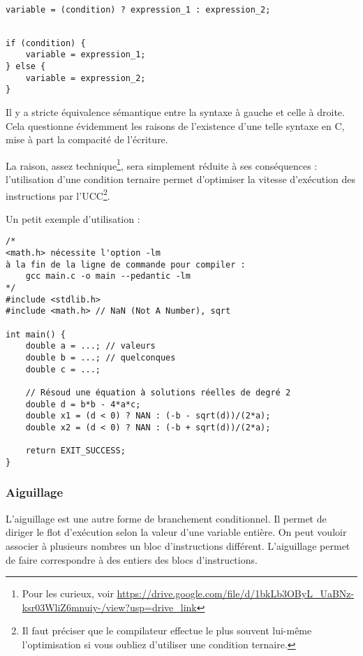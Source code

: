 \documentclass[../../../main.tex]{subfiles}
\begin{document}
\begin{minipage}{0.65\textwidth}
\begin{verbatim}


variable = (condition) ? expression_1 : expression_2;


\end{verbatim}
\end{minipage}
\begin{minipage}{0.35\textwidth}
\begin{verbatim}
if (condition) {
	variable = expression_1;
} else {
	variable = expression_2;
}
\end{verbatim}
\end{minipage}
 
Il y a stricte équivalence sémantique entre la syntaxe à gauche et celle à droite. Cela questionne évidemment les raisons de l'existence d'une telle syntaxe en C, mise à part la compacité de l'écriture.
 
La raison, assez technique\footnote{Pour les curieux, voir \url{https://drive.google.com/file/d/1bkLb3OByL_UaBNz-ksr03WliZ6mnuiy-/view?usp=drive_link}}, sera simplement réduite à ses conséquences : l'utilisation d'une condition ternaire permet d'optimiser la vitesse d'exécution des instructions par l'UCC\footnote{Il faut préciser que le compilateur effectue le plus souvent lui-même l'optimisation si vous oubliez d'utiliser une condition ternaire.}.
 
Un petit exemple d'utilisation :
\begin{verbatim}
/*
<math.h> nécessite l'option -lm
à la fin de la ligne de commande pour compiler :
	gcc main.c -o main --pedantic -lm
*/
#include <stdlib.h>
#include <math.h> // NaN (Not A Number), sqrt

int main() {
	double a = ...; // valeurs
	double b = ...; // quelconques
	double c = ...;

	// Résoud une équation à solutions réelles de degré 2
	double d = b*b - 4*a*c;
	double x1 = (d < 0) ? NAN : (-b - sqrt(d))/(2*a);
	double x2 = (d < 0) ? NAN : (-b + sqrt(d))/(2*a);

	return EXIT_SUCCESS;
}
\end{verbatim}
\subsubsection{Aiguillage}
\label{ssub:aiguillage}
L'aiguillage est une autre forme de branchement conditionnel. Il permet de diriger le flot d'exécution selon la valeur d'une variable entière. On peut vouloir associer à plusieurs nombres un bloc d'instructions différent. L'aiguillage permet de faire correspondre à des entiers des blocs d'instructions.
 
\end{document}
